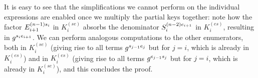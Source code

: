 It is easy to see that the simplifications we cannot perform on the individual expressions are enabled once we multiply the partial keys together: note how the factor $E_{i+1}^{(n-1)s_i}$ in $K_i^{(se)}$ absorbs the denominator ${S_{i}^{(n-2)e_{i+1}}}$ in $K_i^{(es)}$, resulting in $g^{s_i e_{i+1}}$.
We can perform analogous computations to the other enumerators, both in $K_i^{(se)}$ (giving rise to all terms $g^{s_{j-1}e_j}$ but for $j=i$, which is already in $K_i^{(es)}$) and in $K_i^{(es)}$ (giving rise to all terms $g^{e_{j-1}s_j}$ but for $j=i$, which is already in $K_i^{(se)}$), and this concludes the proof.
%
